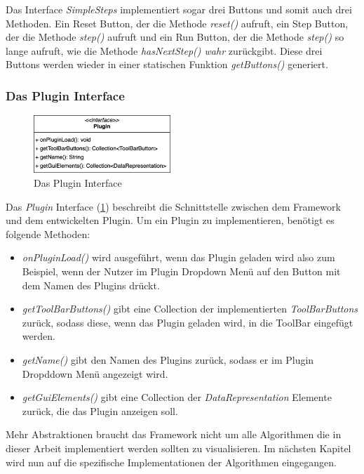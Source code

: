 Das Interface \textit{SimpleSteps} implementiert sogar drei Buttons und somit auch
drei Methoden. Ein Reset Button, der die Methode \textit{reset()} aufruft, ein Step
Button, der die Methode \textit{step()} aufruft und ein Run Button, der die Methode
\textit{step()} so lange aufruft, wie die Methode \textit{hasNextStep() wahr} zurückgibt.
Diese drei Buttons werden wieder in einer statischen Funktion \textit{getButtons()}
generiert.\\


\newpage
\subsubsection{Das Plugin Interface}
\begin{figure}
  \centering
  \vspace{-20pt}
  \includegraphics[width=0.46\textwidth]{fig/Plugin_methods.png}
  \caption{Das Plugin Interface}
  \label{fig:PluginInterface}
  \vspace{-20pt}
\end{figure}

Das \textit{Plugin} Interface (\cref{fig:PluginInterface}) beschreibt die
Schnittstelle zwischen dem Framework und dem entwickelten Plugin.
Um ein Plugin zu implementieren, benötigt es folgende Methoden:
\vspace{30pt}

\begin{itemize}
  \item \textit{onPluginLoad()} wird ausgeführt, wenn das Plugin geladen wird also zum 
    Beispiel, wenn der Nutzer im Plugin Dropdown Menü auf den Button mit dem Namen des
    Plugins drückt.
  \item \textit{getToolBarButtons()} gibt eine Collection der implementierten \textit{ToolBarButtons}
    zurück, sodass diese, wenn das Plugin geladen wird, in die ToolBar eingefügt werden.
  \item \textit{getName()} gibt den Namen des Plugins zurück, sodass er im Plugin Dropddown Menü
    angezeigt wird.
  \item \textit{getGuiElements()} gibt eine Collection der \textit{DataRepresentation} Elemente
    zurück, die das Plugin anzeigen soll.
\end{itemize}
Mehr Abstraktionen braucht das Framework nicht um alle Algorithmen die in dieser
Arbeit implementiert werden sollten zu visualisieren.
Im nächsten Kapitel wird nun auf die spezifische Implementationen der Algorithmen eingegangen.
